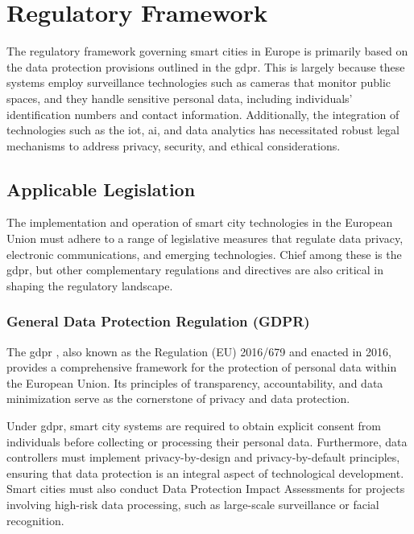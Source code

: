 \chapter{Regulatory Framework}\label{ch:regulatory_framework}

The regulatory framework governing smart cities in Europe is primarily based on the data protection provisions outlined in the \gls{gdpr}. This is largely because these systems employ surveillance technologies such as cameras that monitor public spaces, and they handle sensitive personal data, including individuals' identification numbers and contact information. Additionally, the integration of technologies such as the \gls{iot}, \gls{ai}, and data analytics has necessitated robust legal mechanisms to address privacy, security, and ethical considerations.

\section{Applicable Legislation}

The implementation and operation of smart city technologies in the European Union must adhere to a range of legislative measures that regulate data privacy, electronic communications, and emerging technologies. Chief among these is the \gls{gdpr}, but other complementary regulations and directives are also critical in shaping the regulatory landscape.

\subsection{General Data Protection Regulation (GDPR)}

The \gls{gdpr} \autocite{eu-679-2016}, also known as the Regulation (EU) 2016/679 and enacted in 2016, provides a comprehensive framework for the protection of personal data within the European Union. Its principles of transparency, accountability, and data minimization serve as the cornerstone of privacy and data protection.

Under \gls{gdpr}, smart city systems are required to obtain explicit consent from individuals before collecting or processing their personal data. Furthermore, data controllers must implement privacy-by-design and privacy-by-default principles, ensuring that data protection is an integral aspect of technological development. Smart cities must also conduct Data Protection Impact Assessments for projects involving high-risk data processing, such as large-scale surveillance or facial recognition.

